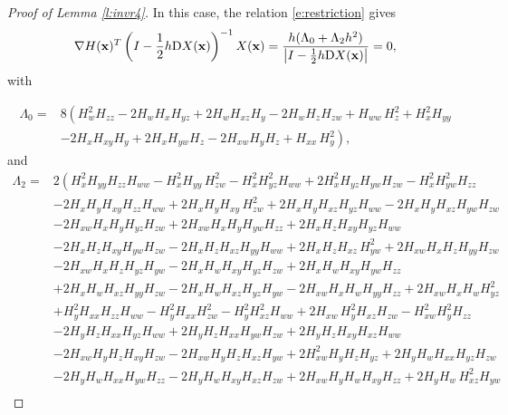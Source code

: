 \documentclass[10pt,a4paper]{amsart}
\begin{document}
\begin{proof}[Proof of Lemma \ref{l:invr4}]
In this case, the relation \eqref{e:restriction} gives
\begin{equation}\label{e:h0h2r4}
\nabla H({\bf{x}})^T \left(I-\frac{1}{2}h{\mathrm D}X({\bf{x}})\right)^{-1}X({\bf{x}})=\frac{h(\Lambda_0+\Lambda_2 h^2)}{\left|I-\frac{1}{2}h {\mathrm D}X({\bf{x}})\right|}=0,
\end{equation}
with

\begin{align*}
\Lambda_0=&8 \left(H_{w}^{2} H_{zz} -2 H_{w} H_{x} H_{yz} +2 H_{w} H_{xz} H_{y} -2 H_{w} H_{z} H_{zw} + H_{ww} \,H_{z}^{2}+ H_{x}^{2} H_{yy}\right.\\
&\left. -2 H_{x} H_{xy} H_{y} +2 H_{x} H_{yw} H_{z} -2 H_{xw} H_{y} H_{z} + H_{xx} \,H_{y}^{2}\right),
\end{align*}
and
\begin{align*}
\Lambda_2=&
2\left( H_{x}^{2} H_{yy} H_{zz} H_{ww} - H_{x}^{2} H_{yy} \,H_{zw}^{2}- H_{x}^{2} H_{yz}^{2} H_{ww} +2 H_{x}^{2} H_{yz} H_{yw} H_{zw} - H_{x}^{2} H_{yw}^{2} H_{zz}\right.\\
& -2 H_{x} H_{y} H_{xy} H_{zz} H_{ww} +2 H_{x} H_{y} H_{xy} \,H_{zw}^{2}+2 H_{x} H_{y} H_{xz} H_{yz} H_{ww} -2 H_{x} H_{y} H_{xz} H_{yw} H_{zw}\\
& -2 H_{xw} H_{x} H_{y} H_{yz} H_{zw} +2 H_{xw} H_{x} H_{y} H_{yw} H_{zz} +2 H_{x} H_{z} H_{xy} H_{yz} H_{ww} \\
& -2 H_{x} H_{z} H_{xy} H_{yw} H_{zw}-2 H_{x} H_{z} H_{xz} H_{yy} H_{ww} +2 H_{x} H_{z} H_{xz} \,H_{yw}^{2}+2 H_{xw} H_{x} H_{z} H_{yy} H_{zw} \\
&-2 H_{xw} H_{x} H_{z} H_{yz} H_{yw} -2 H_{x} H_{w} H_{xy} H_{yz} H_{zw} +2 H_{x} H_{w} H_{xy} H_{yw} H_{zz}   \\
&+2 H_{x} H_{w} H_{xz} H_{yy} H_{zw}-2 H_{x} H_{w} H_{xz} H_{yz} H_{yw}-2 H_{xw} H_{x} H_{w} H_{yy} H_{zz} +2 H_{xw} H_{x} H_{w} H_{yz}^{2}\\
&+ H_{y}^{2} H_{xx} H_{zz} H_{ww} - H_{y}^{2} H_{xx} H_{zw}^{2}- H_{y}^{2} H_{xz}^{2} H_{ww} +2 H_{xw} \,H_{y}^{2} H_{xz} H_{zw} - H_{xw}^{2} H_{y}^{2} H_{zz} \\
&-2 H_{y} H_{z} H_{xx} H_{yz} H_{ww} +2 H_{y} H_{z} H_{xx} H_{yw} H_{zw} +2 H_{y} H_{z} H_{xy} H_{xz} H_{ww}  \\
&-2 H_{xw} H_{y} H_{z} H_{xy} H_{zw} -2 H_{xw} H_{y} H_{z} H_{xz} H_{yw}+2 H_{xw}^{2} H_{y} H_{z} H_{yz} +2 H_{y} H_{w} H_{xx} H_{yz} H_{zw}  \\
&-2 H_{y} H_{w} H_{xx} H_{yw} H_{zz}-2 H_{y} H_{w} H_{xy} H_{xz} H_{zw}+2 H_{xw} H_{y} H_{w} H_{xy} H_{zz} +2 H_{y} H_{w} \,H_{xz}^{2} H_{yw} \\

\end{align*}
\end{proof}
\end{document}
